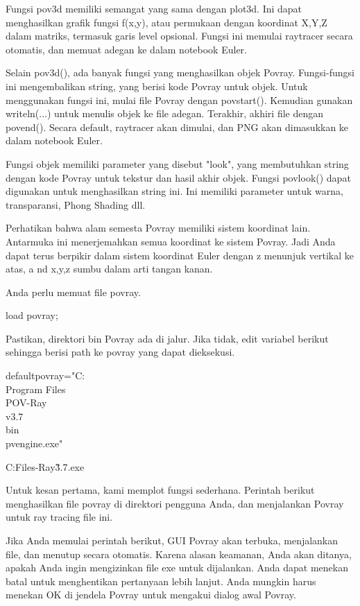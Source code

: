 \documentclass{article}
\begin{document}
Fungsi pov3d memiliki semangat yang sama dengan plot3d. Ini dapat
menghasilkan grafik fungsi f(x,y), atau permukaan dengan koordinat
X,Y,Z dalam matriks, termasuk garis level opsional. Fungsi ini memulai
raytracer secara otomatis, dan memuat adegan ke dalam notebook Euler.


Selain pov3d(), ada banyak fungsi yang menghasilkan objek Povray.
Fungsi-fungsi ini mengembalikan string, yang berisi kode Povray untuk
objek. Untuk menggunakan fungsi ini, mulai file Povray dengan
povstart(). Kemudian gunakan writeln(...) untuk menulis objek ke file
adegan. Terakhir, akhiri file dengan povend(). Secara default,
raytracer akan dimulai, dan PNG akan dimasukkan ke dalam notebook
Euler.


Fungsi objek memiliki parameter yang disebut "look", yang membutuhkan
string dengan kode Povray untuk tekstur dan hasil akhir objek. Fungsi
povlook() dapat digunakan untuk menghasilkan string ini. Ini memiliki
parameter untuk warna, transparansi, Phong Shading dll.


Perhatikan bahwa alam semesta Povray memiliki sistem koordinat lain.
Antarmuka ini menerjemahkan semua koordinat ke sistem Povray. Jadi
Anda dapat terus berpikir dalam sistem koordinat Euler dengan z
menunjuk vertikal ke atas, a nd x,y,z sumbu dalam arti tangan kanan.


Anda perlu memuat file povray.


\>load povray;


Pastikan, direktori bin Povray ada di jalur. Jika tidak, edit variabel
berikut sehingga berisi path ke povray yang dapat dieksekusi.


\>defaultpovray="C:\\Program Files\\POV-Ray\\v3.7\\bin\\pvengine.exe"


    C:\Program Files\POV-Ray\v3.7\bin\pvengine.exe

Untuk kesan pertama, kami memplot fungsi sederhana. Perintah berikut
menghasilkan file povray di direktori pengguna Anda, dan menjalankan
Povray untuk ray tracing file ini.


Jika Anda memulai perintah berikut, GUI Povray akan terbuka,
menjalankan file, dan menutup secara otomatis. Karena alasan keamanan,
Anda akan ditanya, apakah Anda ingin mengizinkan file exe untuk
dijalankan. Anda dapat menekan batal untuk menghentikan pertanyaan
lebih lanjut. Anda mungkin harus menekan OK di jendela Povray untuk
mengakui dialog awal Povray.
\end{document}
